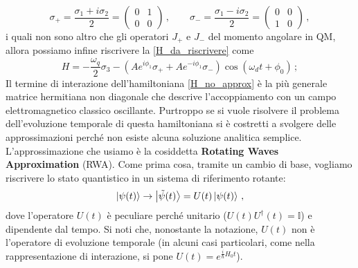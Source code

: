\begin{equation}\label{sigma_+_-}
    \sigma_+ = \frac{\sigma_1 + i \sigma_2}{2} = 
    \begin{pmatrix}
    0 & 1 \\ 0 & 0
    \end{pmatrix} \, , \qquad 
    \sigma_- = \frac{\sigma_1 - i \sigma_2}{2} = 
    \begin{pmatrix}
    0 & 0 \\ 1 & 0
    \end{pmatrix} \, ,
\end{equation}
i quali non sono altro che gli operatori $J_+$ e $J_-$ del momento angolare in QM, allora possiamo infine riscrivere la \eqref{H_da_riscrivere} come
\begin{equation}\label{H_no_approx}
    H = - \frac{\omega_q}{2} \sigma_3 - \left( A e^{i \phi_1} \sigma_+ + A e^{-i \phi_1} \sigma_- \right) \cos (\omega_d t + \phi_0) \, ;
\end{equation}
Il termine di interazione dell'hamiltoniana \eqref{H_no_approx} è la più generale matrice hermitiana non diagonale che descrive l'accoppiamento con un campo elettromagnetico classico oscillante. Purtroppo se si vuole risolvere il problema dell'evoluzione temporale di questa hamiltoniana si è costretti a svolgere delle approssimazioni perché non esiste alcuna soluzione analitica semplice. L'approssimazione che usiamo è la cosiddetta \textbf{Rotating Waves Approximation} (RWA). Come prima cosa, tramite un cambio di base, vogliamo riscrivere lo stato quantistico in un sistema di riferimento rotante:
\begin{equation}\label{rotation_RWA}
    \ket{\psi(t)} \rightarrow \ket{ \tilde{\psi}(t)} = U(t) \ket{\psi(t)} \, ,
\end{equation}
dove l'operatore $U(t)$ è peculiare perché unitario ($U(t) U^\dag (t) = \mathbb{I}$) e dipendente dal tempo. Si noti che, nonostante la notazione, $U(t)$ non è l'operatore di evoluzione temporale (in alcuni casi particolari, come nella rappresentazione di interazione, si pone $U(t) = e^{\frac{i}{\hbar} H_0 t}$). 


